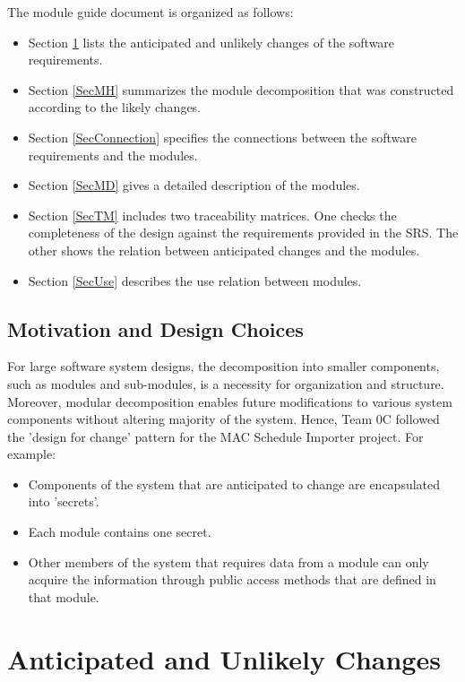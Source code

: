 \documentclass[12pt, titlepage]{article}
\begin{document}
The module guide document is organized as follows:\\
\begin{itemize}
\item Section \ref{SecChange} lists the anticipated and unlikely changes of the software
requirements.
\item Section \ref{SecMH} summarizes the module decomposition that
was constructed according to the likely changes.
\item  Section \ref{SecConnection}
specifies the connections between the software requirements and the
modules.
\item Section \ref{SecMD} gives a detailed description of the
modules.
\item  Section \ref{SecTM} includes two traceability matrices. One checks
the completeness of the design against the requirements provided in the SRS. The
other shows the relation between anticipated changes and the modules.
\item Section
\ref{SecUse} describes the use relation between modules.
\end{itemize}

\subsection{Motivation and Design Choices}
For large software system designs, the decomposition into smaller components, such as modules and sub-modules, is a necessity for organization and structure. Moreover, modular decomposition enables future modifications to various system components without altering majority of the system. Hence, Team 0C followed the 'design for change' pattern for the MAC Schedule Importer project. For example: 
\begin{itemize}
    \item Components of the system that are anticipated to change are encapsulated into 'secrets'.
    \item Each module contains one secret.
    \item Other members of the system that requires data from a module can only acquire the information through public access methods that are defined in that module.
\end{itemize}

\section{Anticipated and Unlikely Changes} \label{SecChange}
\end{document}
